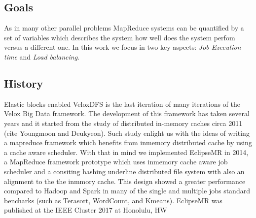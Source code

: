 \subsection{Goals} 

As in many other parallel problems MapReduce systems can be quantified by a set of 
variables which describes the system how well does the system perfom versus a different one. 
In this work we focus in two key aspects: \textit{Job Execution time} and \textit{Load balancing}.
%
 
\subsection{History}
Elastic blocks enabled VeloxDFS is the last iteration of many iterations of the Velox Big Data framework. The development of this framework has taken several years and it started from the study of distributed in-memory caches circa 2011 (cite Youngmoon and Deukyeon). Such study enlight us with the ideas of writing a mapreduce framework which benefits from inmemory distributed cache by using a cache aware scheduler. With that in mind we implemented EclipseMR in 2014, a MapReduce framework prototype which uses inmemory cache aware job scheduler and a consiting hashing underline distributed file system with also an alignment to the the inmmory cache. This design showed a greater performance compared to Hadoop and Spark in many of the single and multiple jobs standard bencharks (such as Terasort, WordCount, and Kmeans). EclipseMR was published at the IEEE Cluster 2017 at Honolulu, HW\\\\

